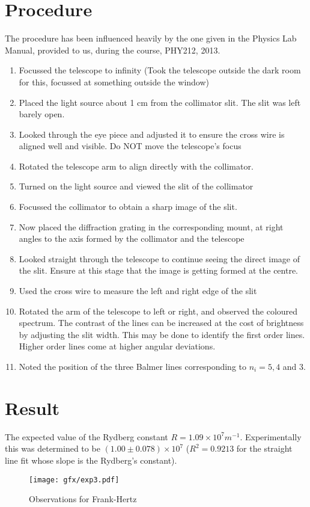 \section{Procedure}
	The procedure has been influenced heavily by the one given in the Physics Lab Manual, provided to us, during the course, PHY212, 2013.
	\begin{enumerate}
		\item Focussed the telescope to infinity (Took the telescope outside the dark room for this, focussed at something outside the window)
		\item Placed the light source about 1 cm from the collimator slit. The slit was left barely open.
		\item Looked through the eye piece and adjusted it to ensure the cross wire is aligned well and visible. Do NOT move the telescope's focus
		\item Rotated the telescope arm to align directly with the collimator.
		\item Turned on the light source and viewed the slit of the collimator
		\item Focussed the collimator to obtain a sharp image of the slit.
		\item Now placed the diffraction grating in the corresponding mount, at right angles to the axis formed by the collimator and the telescope
		\item Looked straight through the telescope to continue seeing the direct image of the slit. Ensure at this stage that the image is getting formed at the centre.
		\item Used the cross wire to measure the left and right edge of the slit
		\item Rotated the arm of the telescope to left or right, and observed the coloured spectrum. The contrast of the lines can be increased at the cost of brightness by adjusting the slit width. This may be done to identify the first order lines. Higher order lines come at higher angular deviations.
		\item Noted the position of the three Balmer lines corresponding to $n_i=5,4$ and 3.
	\end{enumerate}

\section{Result}
	The expected value of the Rydberg constant $R=1.09 \times 10^7 m^{-1}$. Experimentally this was determined to be $(1.00 \pm 0.078) \times 10^{7}$ ($R^2=0.9213$ for the straight line fit whose slope is the Rydberg's constant).

	\clearpage
	\begin{figure}[bth]
		\begin{center}
			\texttt{[image: gfx/exp3.pdf]}
		\end{center}
	\caption[Observations for Frank-Hertz]{Observations for Frank-Hertz}
	\label{e3_result}
	\end{figure}
